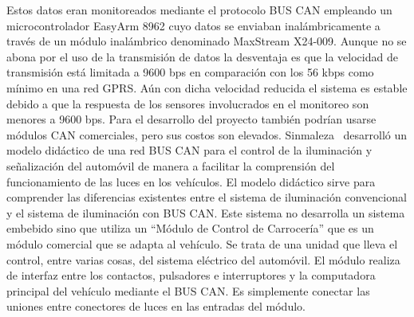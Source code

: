 Estos datos eran monitoreados mediante el protocolo BUS CAN empleando un microcontrolador EasyArm 8962 cuyo datos se enviaban inalámbricamente a través de un  módulo inalámbrico denominado MaxStream X24-009. 
Aunque no se abona por el uso de la transmisión de datos la desventaja es que la velocidad de transmisión está limitada a 9600 bps en comparación con los 56 kbps como mínimo en una red GPRS. 
Aún con dicha velocidad reducida el sistema es estable debido a que la respuesta de los sensores involucrados en el monitoreo son menores a 9600 bps. 
Para el desarrollo del proyecto también podrían usarse módulos CAN comerciales, pero sus costos son elevados. 
Sinmaleza~\cite{CMDI} desarrolló un modelo didáctico de una red BUS CAN para el control de la iluminación y señalización del automóvil de manera a facilitar la comprensión del funcionamiento de las luces en los vehículos. 
El modelo didáctico sirve para comprender las diferencias existentes entre el sistema de iluminación convencional y el sistema de iluminación con BUS CAN. 
Este sistema no desarrolla un sistema embebido sino que utiliza un  “Módulo de Control de Carrocería” que es un módulo comercial que se adapta al vehículo. 
Se trata de una unidad que lleva el control, entre varias cosas, del sistema eléctrico del automóvil. 
El módulo realiza de interfaz entre los contactos, pulsadores e interruptores y la computadora principal del vehículo mediante el BUS CAN.  
Es simplemente conectar las uniones entre conectores de luces en las entradas del módulo. 

